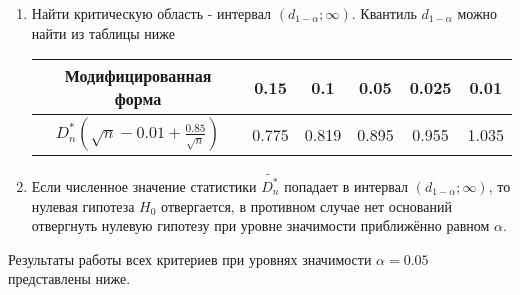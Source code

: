 \begin{enumerate}
\begin{enumerate}
	\end{enumerate}
	
	\item Найти критическую область - интервал $(d_{1-\alpha}; \infty)$. Квантиль $d_{1 - \alpha}$ можно найти из таблицы ниже
	
	\begin{center}
		\begin{tabular}{|c|c|c|c|c|c|}
			\hline
			Модифицированная форма & 0.15 & 0.1 & 0.05 & 0.025 & 0.01 \\
			\hline
			$D^*_n (\sqrt{n} - 0.01 + \frac{0.85}{\sqrt{n}})$ & 0.775 & 0.819 & 0.895 & 0.955 & 1.035 \\
			\hline
		\end{tabular}
	\end{center}
	
	\item Если численное значение статистики $\tilde{D^*_n}$ попадает в интервал $(d_{1 - \alpha}; \infty)$, то нулевая гипотеза $H_0$ отвергается, в противном случае нет оснований отвергнуть нулевую гипотезу при уровне значимости приближённо равном $\alpha$.
	
\end{enumerate}

Результаты работы всех критериев при уровнях значимости $\alpha = 0.05$ представлены ниже.

